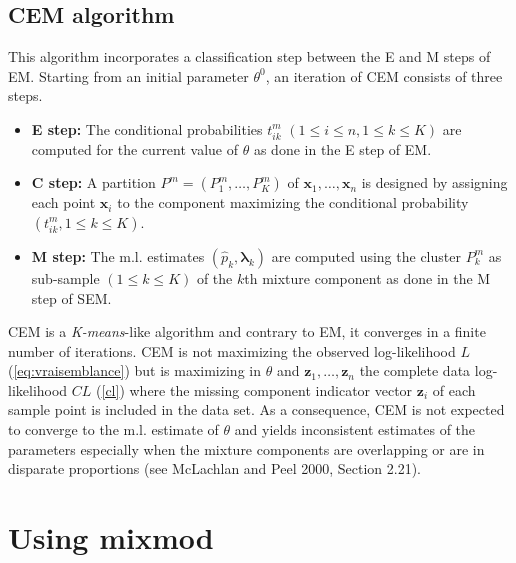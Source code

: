 \documentclass[12pt]{article}
\newcommand{\bz}{\mathbf{z}}
\newcommand{\blambda}{\boldsymbol{\lambda}}
\begin{document}
\subsection{CEM algorithm}
This algorithm incorporates a classification step between the E and M steps of EM. Starting
from an initial parameter $\theta^0$, an iteration of CEM consists of three steps.
\begin{itemize}
\item {\bf E step:} The conditional probabilities $t^m_{ik}$ $(1 \leq i \leq n, 1 \leq k \leq
  K)$ are computed for the current value of $\theta$ as done in the E step of EM.
\item {\bf C step:} A partition $P^m=(P^m_1,\ldots,P^m_K)$ of ${\mathbf x}_1,\ldots,{\mathbf
    x}_n$ is designed by assigning each point ${\mathbf x}_i$ to the component maximizing the
  conditional probability $(t^m_{ik}, 1 \leq k \leq K)$.
\item {\bf M step:} The m.l. estimates $(\hat{p}_k,\blambda_k)$ are computed using the cluster
  $P_k^m$ as sub-sample $(1 \leq k \leq K)$ of the $k$th mixture component as done in the M
  step of SEM.
\end{itemize}
CEM is a {\em K-means}-like algorithm and contrary to EM, it converges in a finite number of
iterations. CEM is not maximizing the observed log-likelihood $L$ (\ref{eq:vraisemblance}) but
is maximizing in $\theta$ and $\bz_{1},\ldots,\bz_{n}$ the complete data log-likelihood $CL$
(\ref{cl}) where the missing component indicator vector $\bz_i$ of each sample point is
included in the data set. As a consequence, CEM is not expected to converge to the m.l.
estimate of $\theta$ and yields inconsistent estimates of the parameters especially when the
mixture components are overlapping or are in disparate proportions (see McLachlan and Peel
2000, Section 2.21).

\section{Using {\sc mixmod}}
\end{document}
